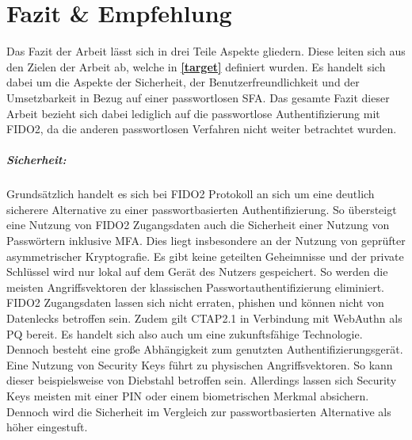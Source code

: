 
\chapter{Fazit \& Empfehlung}
Das Fazit der Arbeit lässt sich in drei Teile Aspekte gliedern. Diese leiten sich aus den Zielen der Arbeit ab, welche in \textbf{\ref{target}} definiert wurden. Es handelt sich dabei um die Aspekte der Sicherheit, der Benutzerfreundlichkeit und der Umsetzbarkeit in Bezug auf einer passwortlosen \ac{SFA}. Das gesamte Fazit dieser Arbeit bezieht sich dabei lediglich auf die passwortlose Authentifizierung mit \ac{FIDO}2, da die anderen passwortlosen Verfahren nicht weiter betrachtet wurden.

\paragraph*{Sicherheit:} Grundsätzlich handelt es sich bei \ac{FIDO}2 Protokoll an sich um eine deutlich sicherere Alternative zu einer passwortbasierten Authentifizierung. So übersteigt eine Nutzung von \ac{FIDO}2 Zugangsdaten auch die Sicherheit einer Nutzung von Passwörtern inklusive \ac{MFA}. Dies liegt insbesondere an der Nutzung von geprüfter asymmetrischer Kryptografie. Es gibt keine geteilten Geheimnisse und der private Schlüssel wird nur lokal auf dem Gerät des Nutzers gespeichert. So werden die meisten Angriffsvektoren der klassischen Passwortauthentifizierung eliminiert. \ac{FIDO}2 Zugangsdaten lassen sich nicht erraten, phishen und können nicht von Datenlecks betroffen sein. Zudem gilt CTAP2.1 in Verbindung mit WebAuthn als \ac{PQ} bereit. Es handelt sich also auch um eine zukunftsfähige Technologie. Dennoch besteht eine große Abhängigkeit zum genutzten Authentifizierungsgerät. Eine Nutzung von Security Keys führt zu physischen Angriffsvektoren. So kann dieser beispielsweise von Diebstahl betroffen sein. Allerdings lassen sich Security Keys meisten mit einer PIN oder einem biometrischen Merkmal absichern. Dennoch wird die Sicherheit im Vergleich zur passwortbasierten Alternative als höher eingestuft.

